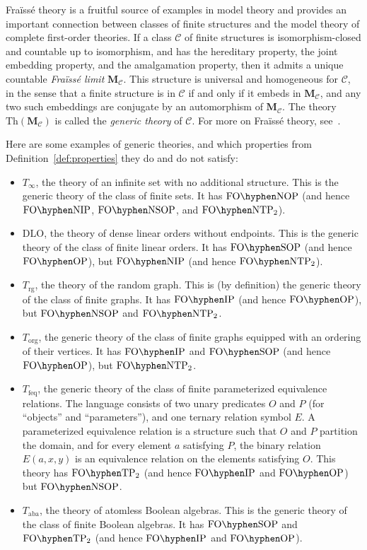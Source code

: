 \documentclass{lmcs}
\newcommand{\Th}{\mathrm{Th}}
\newcommand{\FO}{\mathrm{FO}}
\newcommand{\FOP}[1]{\FO\hyphen#1}
\newcommand{\OP}{\mathrm{OP}}
\newcommand{\NOP}{\mathrm{NOP}}
\newcommand{\IP}{\mathrm{IP}}
\newcommand{\NIP}{\mathrm{NIP}}
\newcommand{\SOP}{\mathrm{SOP}}
\newcommand{\NSOP}{\mathrm{NSOP}}
\newcommand{\TPT}{\mathrm{TP}_2}
\newcommand{\NTPT}{\mathrm{NTP}_2}
\newcommand{\TINF}{T_\infty}
\newcommand{\TRG}{T_\mathrm{rg}}
\newcommand{\DLO}{\mathrm{DLO}}
\newcommand{\TFEQ}{T_{\mathrm{feq}}}
\newcommand{\TORG}{T_{\mathrm{org}}}
\newcommand{\TABA}{T_{\mathrm{aba}}}
\newcommand{\M}{\mathbf{M}}
\newcommand{\Fraisse}{Fra\"iss\'e\xspace}
\theoremstyle{thmC}
\begin{document}
\Fraisse theory is a fruitful source of examples in model theory and provides an important connection between classes of finite structures and the model theory of complete first-order theories. If a class $\mathcal{C}$ of finite structures is isomorphism-closed and countable up to isomorphism, and has the hereditary property, the joint embedding property, and the amalgamation property, then it admits a unique countable \emph{\Fraisse limit} $\M_\mathcal{C}$. This structure is universal and homogeneous for $\mathcal{C}$, in the sense that a finite structure is in $\mathcal{C}$ if and only if it embeds in $\M_\mathcal{C}$, and any two such embeddings are conjugate by an automorphism of $\M_\mathcal{C}$. The theory $\Th(\M_\mathcal{C})$ is called the \emph{generic theory} of $\mathcal{C}$. For more on \Fraisse theory, see~\cite[Section 7.1]{Hodges}.

Here are some examples of generic theories, and which properties from Definition~\ref{def:properties} they do and do not satisfy:

\begin{itemize}
    \item $\TINF$, the theory of an infinite set with no additional structure. This is the generic theory of the class of finite sets. It has $\FOP{\NOP}$ (and hence $\FOP{\NIP}$, $\FOP{\NSOP}$, and $\FOP{\NTPT}$).
    
    \item $\DLO$, the theory of dense linear orders without endpoints. This is the generic theory of the class of finite linear orders. It has $\FOP{\SOP}$ (and hence $\FOP{\OP}$), but $\FOP{\NIP}$ (and hence $\FOP{\NTPT}$).
    
    \item $\TRG$, the theory of the random graph. This is (by definition) the generic theory of the class of finite graphs. It has $\FOP{\IP}$ (and hence $\FOP{\OP}$), but $\FOP{\NSOP}$ and $\FOP{\NTPT}$. 

    
   \item $\TORG$, the generic theory of the class of finite graphs equipped with an ordering of their vertices. It has $\FOP{\IP}$ and $\FOP{\SOP}$ (and hence $\FOP{\OP}$), but $\FOP{\NTPT}$.
   
   \item $\TFEQ$, the generic theory of the class of finite parameterized equivalence relations. The language consists of two unary predicates $O$ and $P$ (for ``objects'' and ``parameters''), and one ternary relation symbol $E$. A parameterized equivalence relation is a structure such that $O$ and $P$ partition the domain, and for every element $a$ satisfying $P$, the binary relation $E(a,x,y)$ is an equivalence relation on the elements satisfying $O$. This theory has $\FOP{\TPT}$ (and hence $\FOP{\IP}$ and $\FOP{\OP}$) but $\FOP{\NSOP}$.
   
   \item $\TABA$, the theory of atomless Boolean algebras. This is the generic theory of the class of finite Boolean algebras. It has $\FOP{\SOP}$ and $\FOP{\TPT}$ (and hence $\FOP{\IP}$ and $\FOP{\OP}$).
\end{itemize}
\end{document}
